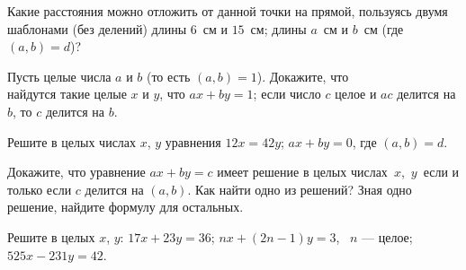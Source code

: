 \documentclass[a4paper,11pt]{article}
\newcommand{\del}{\mathrel{\raisebox{-.3 ex}{${\vdots}$}}}
\begin{document}
Какие расстояния можно отложить от данной точки на прямой,
пользуясь двумя шаблонами (без делений)
 длины $6$~см и $15$~см;
 длины $a$~см и $b$~см (где $(a,b)=d$)?

Пусть целые числа $a$ и $b$  (то есть $(a,b)=1$).
Докажите, что\\
 найдутся такие целые $x$ и $y$, что $ax+by=1$;
 если число $c$ целое и $ac$ делится на $b$,  то $c$ делится на $b$.





Решите в целых числах $x$, $y$ уравнения
$12x=42y$;
$ax+by=0$, где $(a,b)=d$.


 Докажите, что уравнение
$ax+by=c$ имеет решение в целых числах~$x$,~$y$~если
и только если %
$c$ делится на $(a,b)$.
 Как найти одно из решений?
 Зная одно решение,
найдите формулу для остальных. %


Решите в целых  $x$, $y$: 
 $17x+23y=36$;  $nx+(2n-1)y=3$, \ $n$ --- целое;  $525x-231y=42$.

\end{document}

